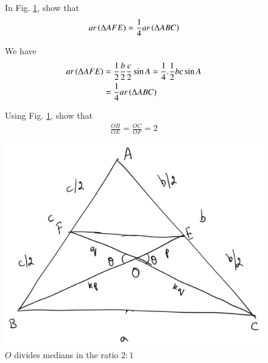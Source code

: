 \begin{figure}[!h]
	\begin{center}
		
\begin{problem}
	In Fig. \ref{ch2_median_ratio_val}, show that
	\begin{equation}
	ar\left(\Delta AFE\right) = 	\frac{1}{4} ar\left(\Delta ABC\right)
	\end{equation}
	\label{ch2_small_triang}
\end{problem}
\proof We have
%
\begin{align}
ar\left(\Delta AFE\right) &= \frac{1}{2} \frac{b}{2}\frac{c}{2}\sin A = \frac{1}{4}.\frac{1}{2}bc \sin A \\
&=\frac{1}{4}ar\left(\Delta ABC\right)
\end{align}
%
\begin{problem}
	Using Fig. \ref{ch2_median_ratio_val}, show that
	\begin{align}
	\frac{OB}{OE} = \frac{OC}{OF} = 2
	\end{align}
\end{problem}
		\includegraphics[width=\columnwidth]{./figs/ch2_median_ratio_val}
		\vspace*{-10cm}
	\end{center}
	\caption{$O$ divides medians in the ratio $2:1$}
	\label{ch2_median_ratio_val}	
\end{figure}
%

